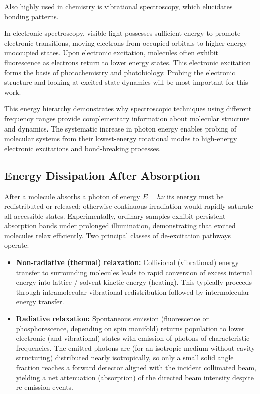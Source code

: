 Also highly used in chemistry is vibrational spectroscopy, which elucidates bonding patterns.

In electronic spectroscopy, visible light possesses sufficient energy to promote electronic transitions, moving electrons from occupied orbitals to higher-energy unoccupied states. Upon electronic excitation, molecules often exhibit fluorescence as electrons return to lower energy states. This electronic excitation forms the basis of photochemistry and photobiology.
Probing the electronic structure and looking at excited state dynamics will be most important for this work.

\noindent This energy hierarchy demonstrates why spectroscopic techniques using different frequency ranges provide complementary information about molecular structure and dynamics. The systematic increase in photon energy enables probing of molecular systems from their lowest-energy rotational modes to high-energy electronic excitations and bond-breaking processes.


\subsection{Energy Dissipation After Absorption}
\label{subsec:energy_dissipation}

\noindent After a molecule absorbs a photon of energy $E = h\nu$ its energy must be redistributed or released; otherwise continuous irradiation would rapidly saturate all accessible states. Experimentally, ordinary samples exhibit persistent absorption bands under prolonged illumination, demonstrating that excited molecules relax efficiently. Two principal classes of de-excitation pathways operate:
\begin{itemize}
	\item \textbf{Non-radiative (thermal) relaxation:} Collisional (vibrational) energy transfer to surrounding molecules leads to rapid conversion of excess internal energy into lattice / solvent kinetic energy (heating). This typically proceeds through intramolecular vibrational redistribution followed by intermolecular energy transfer.
	\item \textbf{Radiative relaxation:} Spontaneous emission (fluorescence or phosphorescence, depending on spin manifold) returns population to lower electronic (and vibrational) states with emission of photons of characteristic frequencies. The emitted photons are (for an isotropic medium without cavity structuring) distributed nearly isotropically, so only a small solid angle fraction reaches a forward detector aligned with the incident collimated beam, yielding a net attenuation (absorption) of the directed beam intensity despite re-emission events.
\end{itemize}

